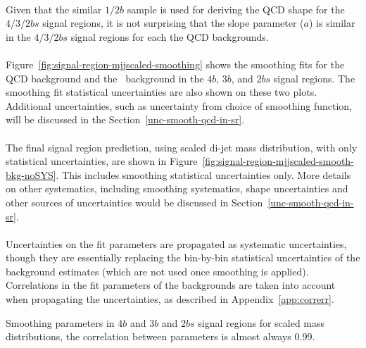 \paragraph{}
Given that the similar $1/2b$ sample is used for deriving the QCD shape for the $4/3/2bs$  signal regions, it is not surprising that the slope parameter ($a$) is similar in  the  $4/3/2bs$ signal regions for each the QCD backgrounds.

\paragraph{}
Figure~\ref{fig:signal-region-mjjscaled-smoothing} shows the smoothing fits for the QCD background and the \ttbar\ background in the $4b$, $3b$, and $2bs$ signal regions.
The smoothing fit statistical uncertainties are also shown on these two plots. 
Additional uncertainties, such as uncertainty from choice of smoothing function, will be discussed in the Section~\ref{unc-smooth-qcd-in-sr}.

\paragraph{}
The final signal region prediction, using scaled di-jet mass distribution, with only statistical uncertainties, are shown in Figure~\ref{fig:signal-region-mjjscaled-smooth-bkg-noSYS}. 
This includes smoothing statistical uncertainties only. 
More details on other systematics, including smoothing systematics, shape uncertainties and other sources of uncertainties would be discussed in Section~\ref{unc-smooth-qcd-in-sr}.

\paragraph{}
Uncertainties on the fit parameters are propagated as systematic uncertainties, though they are essentially replacing the bin-by-bin statistical uncertainties of the background estimates (which are not used once smoothing is applied). Correlations in the fit parameters of the backgrounds are taken into account when propagating the uncertainties, as described in Appendix~\ref{app:correrr}.


\begin{table}[htbp!]
\begin{center}
\caption{Smoothing parameters in $4b$ and $3b$ and $2bs$ signal regions for scaled mass distributions, the correlation between parameters is almost always 0.99.}

\label{tab:smoothparams_pole}
\end{center}
\end{table}

